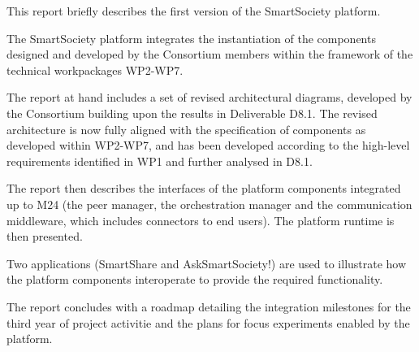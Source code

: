 This report briefly describes the first version of the SmartSociety platform. 

The SmartSociety platform integrates the instantiation of the components designed and developed by the Consortium members within the framework of the technical workpackages WP2-WP7. 

The report at hand includes a set of revised architectural diagrams, developed by the Consortium building upon the results in Deliverable D8.1. The revised architecture is now fully aligned with the specification of components as developed within WP2-WP7, and has been developed according to the high-level requirements identified in WP1 and further analysed in D8.1.

The report then describes the interfaces of the platform components integrated up to M24 (the peer manager, the orchestration manager and the communication middleware, which includes connectors to end users). The platform runtime is then presented.

Two applications (SmartShare and AskSmartSociety!) are used to illustrate how the platform components interoperate to provide the required functionality.

The report concludes with a roadmap detailing the integration milestones for the third year of project activitie and the plans for focus experiments enabled by the platform.  

